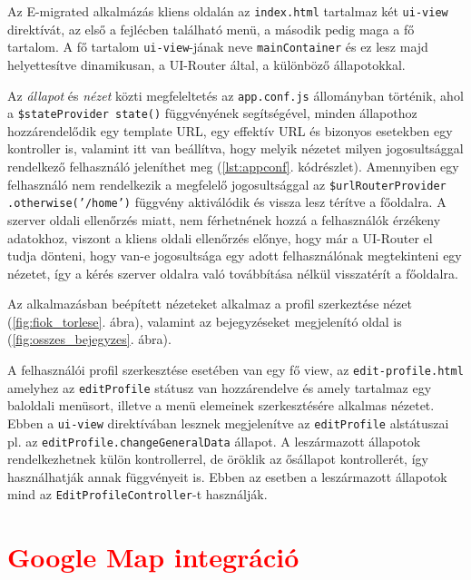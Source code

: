 \begin{reviewed}
Az E-migrated alkalmázás kliens oldalán az \texttt{index.html} tartalmaz két \texttt{ui-view} direktívát, az első a fejlécben található menü, a második pedig maga a fő tartalom. A fő tartalom \texttt{ui-view}-jának neve \texttt{mainContainer} és ez lesz majd helyettesítve dinamikusan, a UI-Router által, a különböző állapotokkal. 


Az \textit{állapot} és \textit{nézet} közti megfeleltetés az \texttt{app.conf.js} állományban történik, ahol a \texttt{\$stateProvider state()} függvényének segítségével, minden állapothoz hozzárendelődik egy template URL, egy effektív URL és bizonyos esetekben egy kontroller is, valamint itt van beállítva, hogy melyik nézetet milyen jogosultsággal rendelkező felhasználó jeleníthet meg (\ref{lst:appconf}. kódrészlet). Amennyiben egy felhasználó nem rendelkezik a megfelelő jogosultsággal az \texttt{\$urlRouterProvider} \texttt{.otherwise('/home')} függvény aktiválódik és vissza lesz térítve a főoldalra. A szerver oldali ellenőrzés miatt, nem férhetnének hozzá a felhasználók érzékeny adatokhoz, viszont a kliens oldali ellenőrzés előnye, hogy már a UI-Router el tudja dönteni, hogy van-e jogosultsága egy adott felhasználónak megtekinteni egy nézetet, így a kérés szerver oldalra való továbbítása nélkül visszatérít a főoldalra.

Az alkalmazásban beépített nézeteket alkalmaz a profil szerkeztése nézet (\ref{fig:fiok_torlese}. ábra), valamint az bejegyzéseket megjelenító oldal is (\ref{fig:osszes_bejegyzes}. ábra).

A felhasználói profil szerkesztése esetében van egy fő view, az \texttt{edit-profile.html} amelyhez az \texttt{editProfile} státusz van hozzárendelve és amely tartalmaz egy baloldali menüsort, illetve a menü elemeinek szerkesztésére alkalmas nézetet. Ebben a \texttt{ui-view} direktívában lesznek megjelenítve az \texttt{editProfile} alstátuszai pl. az \texttt{editProfile.changeGeneralData} állapot. A leszármazott állapotok rendelkezhetnek külön kontrollerrel, de öröklik az ősállapot kontrollerét, így használhatják annak függvényeit is. Ebben az esetben a leszármazott állapotok mind az \texttt{EditProfileController}-t használják. 
\end{reviewed}




\section{\textcolor{red}{Google Map integráció}}
\label{sec:googleMap}


